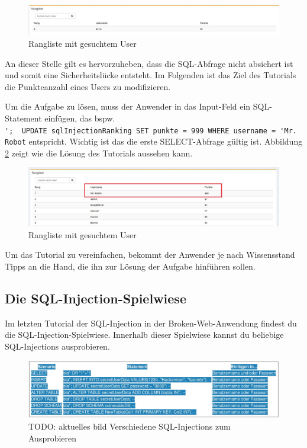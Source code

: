 \begin{figure}[H]
	\centering
	\includegraphics[width=\textwidth]{images/SQL_Injection/sql_modify_searched.jpg}
	\caption{Rangliste mit gesuchtem User}
	\label{fig:sql-modify-ranking-searched}
\end{figure}

An dieser Stelle gilt es hervorzuheben, dass die SQL-Abfrage nicht absichert ist und somit eine Sicherheitslücke entsteht. Im Folgenden ist das Ziel des Tutorials die Punkteanzahl eines Users zu modifizieren. 

Um die Aufgabe zu lösen, muss der Anwender in das Input-Feld ein SQL-Statement einfügen, das bspw. \\ \colorbox{altgray}{\lstinline|';  UPDATE sqlInjectionRanking SET punkte = 999 WHERE username = 'Mr. Robot|} entspricht. Wichtig ist das die erste SELECT-Abfrage gültig ist. Abbildung \ref{fig:sql-modify-ranking-solved} zeigt wie die Lösung des Tutorials aussehen kann. 

\begin{figure}[H]
	\centering
	\includegraphics[width=\textwidth]{images/SQL_Injection/sql_modify_solved.jpg}
	\caption{Rangliste mit gesuchtem User}
	\label{fig:sql-modify-ranking-solved}
\end{figure}

Um das Tutorial zu vereinfachen, bekommt der Anwender je nach Wissensstand Tipps an die Hand, die ihn zur Lösung der Aufgabe hinführen sollen. 


\subsection{Die SQL-Injection-Spielwiese}
Im letzten Tutorial der SQL-Injection in der Broken-Web-Anwendung findest du die SQL-Injection-Spielwiese. Innerhalb dieser Spielwiese kannst du beliebige SQL-Injections ausprobieren.

\begin{figure}[H]
	\centering
	\includegraphics[width=\textwidth]{images/SQL_Injection/various_injections.jpg}
	\caption{TODO: aktuelles bild Verschiedene SQL-Injections zum Ausprobieren}
	\label{fig:various_injections}
\end{figure}

